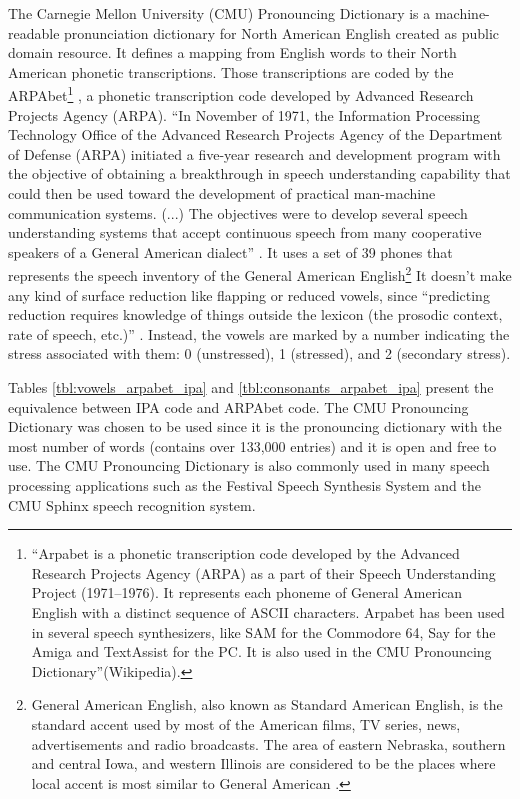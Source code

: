 The Carnegie Mellon University (CMU) Pronouncing Dictionary is a 
machine-readable pronunciation dictionary for North American English
created as public domain resource. It defines a mapping from English
words to their North American phonetic transcriptions. 
Those transcriptions are coded by the ARPAbet\footnote{
``Arpabet is a phonetic transcription code developed by the Advanced Research Projects Agency (ARPA) as a part of their Speech Understanding Project (1971--1976). It represents each phoneme of General American English with a distinct sequence of ASCII characters. Arpabet has been used in several speech synthesizers, like SAM for the Commodore 64, Say for the Amiga and TextAssist for the PC. It is also used in the CMU Pronouncing Dictionary''(Wikipedia).
} \citep{Shoup1988}, a phonetic transcription 
code developed by Advanced Research Projects Agency (ARPA).
``In November of 1971, the Information Processing Technology Office of the
Advanced Research Projects Agency of the Department of Defense (ARPA) 
initiated a five-year research and development program with the
objective of obtaining a breakthrough in speech understanding capability
that could then be used toward the development of practical man-machine
communication systems. (...) The objectives were to develop several
speech understanding systems that accept continuous speech from many 
cooperative speakers of a General American dialect'' \citep{klatt1977}.
It uses a set of 39 phones that represents the speech inventory of the 
General American English\footnote{
General American English, also known as Standard American English, is the standard
accent used by most of the American films, TV series, news, advertisements and radio
broadcasts. The area of eastern Nebraska, southern and central Iowa, and western Illinois
are considered to be the places where local accent is most similar to General American
\citep{labov2006atlas}.
}
It doesn't make any 
kind of surface reduction like flapping or reduced vowels, since
``predicting reduction requires knowledge of things outside the lexicon (the prosodic context, 
rate of speech, etc.)'' \cite{jurafsky2009speech}.
Instead, the vowels are marked by a number indicating the stress associated with them: 0 (unstressed),
1 (stressed), and 2 (secondary stress).


Tables \ref{tbl:vowels_arpabet_ipa} and \ref{tbl:consonants_arpabet_ipa} 
present the equivalence between IPA code and ARPAbet code.
The CMU Pronouncing Dictionary was chosen to be used since it 
is the pronouncing dictionary with the most number of words (contains over 133,000 entries) 
and it is open and free to use.
The CMU Pronouncing Dictionary is also commonly
used in many speech processing applications such as the 
Festival Speech Synthesis System and the CMU Sphinx speech recognition system.


